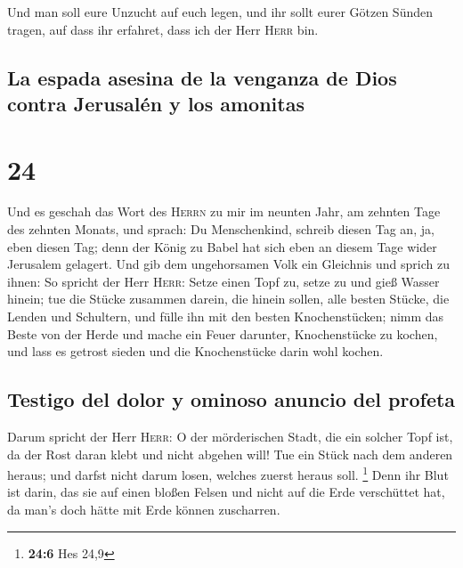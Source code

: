  Und man soll eure Unzucht auf euch legen, und ihr sollt
eurer Götzen Sünden tragen, auf dass ihr erfahret, dass ich der Herr
\textsc{Herr} bin.

\hypertarget{la-espada-asesina-de-la-venganza-de-dios-contra-jerusaluxe9n-y-los-amonitas}{%
\subsection{La espada asesina de la venganza de Dios contra Jerusalén y
los
amonitas}\label{la-espada-asesina-de-la-venganza-de-dios-contra-jerusaluxe9n-y-los-amonitas}}

\hypertarget{section-23}{%
\section{24}\label{section-23}}

 Und es geschah das Wort des \textsc{Herrn} zu mir im
neunten Jahr, am zehnten Tage des zehnten Monats, und sprach:
 Du Menschenkind, schreib diesen Tag an, ja, eben diesen
Tag; denn der König zu Babel hat sich eben an diesem Tage wider
Jerusalem gelagert.  Und gib dem ungehorsamen Volk ein
Gleichnis und sprich zu ihnen: So spricht der Herr \textsc{Herr}: Setze
einen Topf zu, setze zu und gieß Wasser hinein;  tue die
Stücke zusammen darein, die hinein sollen, alle besten Stücke, die
Lenden und Schultern, und fülle ihn mit den besten Knochenstücken;
 nimm das Beste von der Herde und mache ein Feuer
darunter, Knochenstücke zu kochen, und lass es getrost sieden und die
Knochenstücke darin wohl kochen.

\hypertarget{testigo-del-dolor-y-ominoso-anuncio-del-profeta}{%
\subsection{Testigo del dolor y ominoso anuncio del
profeta}\label{testigo-del-dolor-y-ominoso-anuncio-del-profeta}}

 Darum spricht der Herr \textsc{Herr}: O der mörderischen
Stadt, die ein solcher Topf ist, da der Rost daran klebt und nicht
abgehen will! Tue ein Stück nach dem anderen heraus; und darfst nicht
darum losen, welches zuerst heraus soll. \footnote{\textbf{24:6} Hes
  24,9}  Denn ihr Blut ist darin, das sie auf einen bloßen
Felsen und nicht auf die Erde verschüttet hat, da man's doch hätte mit
Erde können zuscharren.

